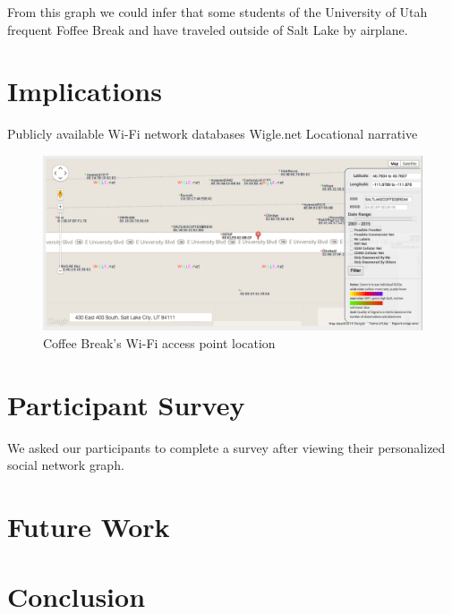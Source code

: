 \documentclass[letterpaper,twocolumn,10pt]{article}
\begin{document}
From this graph we could infer that some students of the University of Utah frequent Foffee Break and have traveled outside of Salt Lake by airplane.

\section{Implications}
Publicly available Wi-Fi network databases
Wigle.net
Locational narrative 
\begin{figure}
\centering
\includegraphics[scale=.45]{wigle}
\caption{\textsf{Coffee Break's Wi-Fi access point location}}
\end{figure}

\section{Participant Survey}
We asked our participants to complete a survey after viewing their personalized social network graph.


\section{Future Work}

\section{Conclusion}
\end{document}
